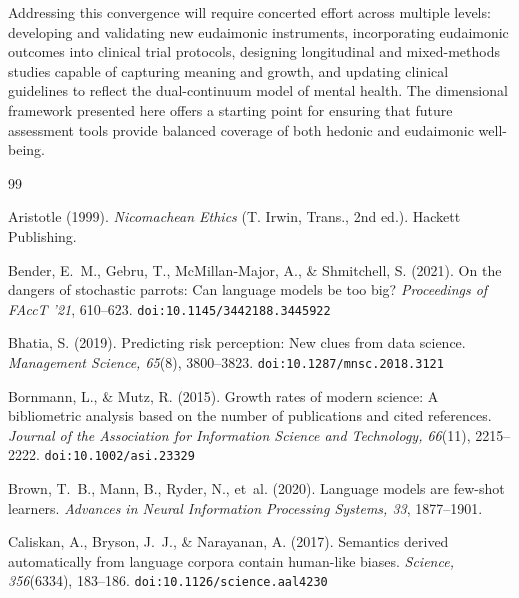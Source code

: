 \documentclass[12pt,a4paper]{article}
\begin{document}
Addressing this convergence will require concerted effort across multiple levels: developing and validating new eudaimonic instruments, incorporating eudaimonic outcomes into clinical trial protocols, designing longitudinal and mixed-methods studies capable of capturing meaning and growth, and updating clinical guidelines to reflect the dual-continuum model of mental health.
The dimensional framework presented here offers a starting point for ensuring that future assessment tools provide balanced coverage of both hedonic and eudaimonic well-being.

\newpage


\begin{thebibliography}{99}

Aristotle (1999).
\textit{Nicomachean Ethics} (T. Irwin, Trans., 2nd ed.).
Hackett Publishing.

Bender, E.~M., Gebru, T., McMillan-Major, A., \& Shmitchell, S. (2021).
On the dangers of stochastic parrots: Can language models be too big?
\textit{Proceedings of FAccT '21}, 610--623.
\texttt{doi:10.1145/3442188.3445922}

Bhatia, S. (2019).
Predicting risk perception: New clues from data science.
\textit{Management Science, 65}(8), 3800--3823.
\texttt{doi:10.1287/mnsc.2018.3121}

Bornmann, L., \& Mutz, R. (2015).
Growth rates of modern science: A bibliometric analysis based on the number of publications and cited references.
\textit{Journal of the Association for Information Science and Technology, 66}(11), 2215--2222.
\texttt{doi:10.1002/asi.23329}

Brown, T.~B., Mann, B., Ryder, N., et~al. (2020).
Language models are few-shot learners.
\textit{Advances in Neural Information Processing Systems, 33}, 1877--1901.

Caliskan, A., Bryson, J.~J., \& Narayanan, A. (2017).
Semantics derived automatically from language corpora contain human-like biases.
\textit{Science, 356}(6334), 183--186.
\texttt{doi:10.1126/science.aal4230}


\end{thebibliography}
\end{document}
